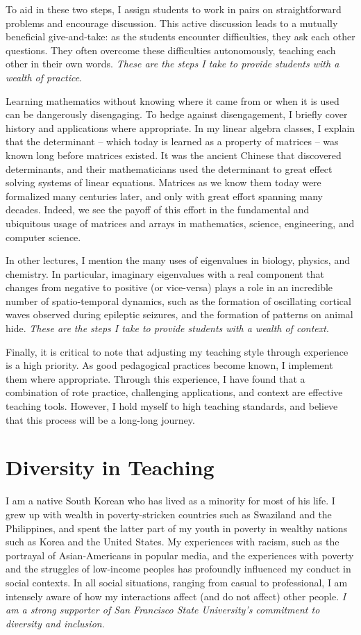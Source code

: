 \documentclass[a4paper,11pt]{article}
\begin{document}
To aid in these two steps, I assign students to work in pairs on straightforward problems and encourage discussion. This active discussion leads to a mutually beneficial give-and-take:  as the students encounter difficulties, they ask each other questions. They often overcome these difficulties autonomously, teaching each other in their own words. \textit{These are the steps I take to provide students with a wealth of practice}.

Learning mathematics without knowing where it came from or when it is used can be dangerously disengaging. To hedge against disengagement, I briefly cover history and applications where appropriate. In my linear algebra classes, I explain that the determinant -- which today is learned as a property of matrices -- was known long before matrices existed. It was the ancient Chinese that discovered determinants, and their mathematicians used the determinant to great effect solving systems of linear equations. Matrices as we know them today were formalized many centuries later, and only with great effort spanning many decades. Indeed, we see the payoff of this effort in the fundamental and ubiquitous usage of matrices and arrays in mathematics, science, engineering, and computer science.

In other lectures, I mention the many uses of eigenvalues in biology, physics, and chemistry. In particular, imaginary eigenvalues with a real component that changes from negative to positive (or vice-versa) plays a role in an incredible number of spatio-temporal dynamics, such as the formation of oscillating cortical waves observed during epileptic seizures, and the formation of patterns on animal hide. \textit{These are the steps I take to provide students with a wealth of context}.

Finally, it is critical to note that adjusting my teaching style through experience is a high priority. As good pedagogical practices become known, I implement them where appropriate. Through this experience, I have found that a combination of rote practice, challenging applications, and context are effective teaching tools. However, I hold myself to high teaching standards, and believe that this process will be a long-long journey.

\section{Diversity in Teaching}
I am a native South Korean who has lived as a minority for most of his life. I grew up with wealth in poverty-stricken countries such as Swaziland and the Philippines, and spent the latter part of my youth in poverty in wealthy nations such as Korea and the United States. My experiences with racism, such as the portrayal of Asian-Americans in popular media, and the experiences with poverty and the struggles of low-income peoples has profoundly influenced my conduct in social contexts. In all social situations, ranging from casual to professional, I am intensely aware of how my interactions affect (and do not affect) other people. \textit{I am a strong supporter of San Francisco State University's commitment to diversity and inclusion}.
\end{document}
